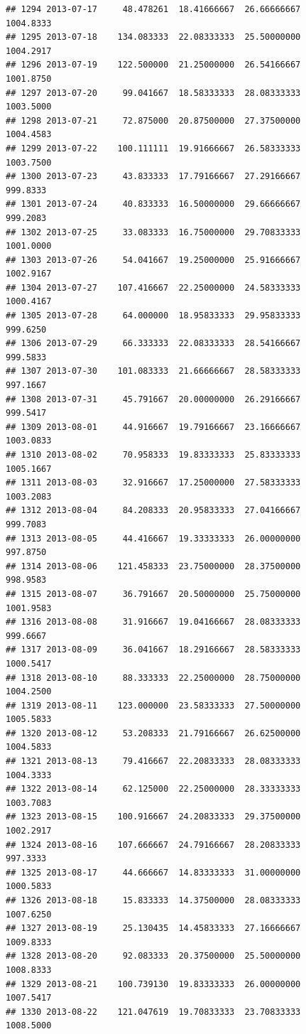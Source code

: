 \documentclass[
]{article}
\begin{document}
\begin{verbatim}
## 1294 2013-07-17     48.478261  18.41666667  26.66666667    1004.8333
## 1295 2013-07-18    134.083333  22.08333333  25.50000000    1004.2917
## 1296 2013-07-19    122.500000  21.25000000  26.54166667    1001.8750
## 1297 2013-07-20     99.041667  18.58333333  28.08333333    1003.5000
## 1298 2013-07-21     72.875000  20.87500000  27.37500000    1004.4583
## 1299 2013-07-22    100.111111  19.91666667  26.58333333    1003.7500
## 1300 2013-07-23     43.833333  17.79166667  27.29166667     999.8333
## 1301 2013-07-24     40.833333  16.50000000  29.66666667     999.2083
## 1302 2013-07-25     33.083333  16.75000000  29.70833333    1001.0000
## 1303 2013-07-26     54.041667  19.25000000  25.91666667    1002.9167
## 1304 2013-07-27    107.416667  22.25000000  24.58333333    1000.4167
## 1305 2013-07-28     64.000000  18.95833333  29.95833333     999.6250
## 1306 2013-07-29     66.333333  22.08333333  28.54166667     999.5833
## 1307 2013-07-30    101.083333  21.66666667  28.58333333     997.1667
## 1308 2013-07-31     45.791667  20.00000000  26.29166667     999.5417
## 1309 2013-08-01     44.916667  19.79166667  23.16666667    1003.0833
## 1310 2013-08-02     70.958333  19.83333333  25.83333333    1005.1667
## 1311 2013-08-03     32.916667  17.25000000  27.58333333    1003.2083
## 1312 2013-08-04     84.208333  20.95833333  27.04166667     999.7083
## 1313 2013-08-05     44.416667  19.33333333  26.00000000     997.8750
## 1314 2013-08-06    121.458333  23.75000000  28.37500000     998.9583
## 1315 2013-08-07     36.791667  20.50000000  25.75000000    1001.9583
## 1316 2013-08-08     31.916667  19.04166667  28.08333333     999.6667
## 1317 2013-08-09     36.041667  18.29166667  28.58333333    1000.5417
## 1318 2013-08-10     88.333333  22.25000000  28.75000000    1004.2500
## 1319 2013-08-11    123.000000  23.58333333  27.50000000    1005.5833
## 1320 2013-08-12     53.208333  21.79166667  26.62500000    1004.5833
## 1321 2013-08-13     79.416667  22.20833333  28.08333333    1004.3333
## 1322 2013-08-14     62.125000  22.25000000  28.33333333    1003.7083
## 1323 2013-08-15    100.916667  24.20833333  29.37500000    1002.2917
## 1324 2013-08-16    107.666667  24.79166667  28.20833333     997.3333
## 1325 2013-08-17     44.666667  14.83333333  31.00000000    1000.5833
## 1326 2013-08-18     15.833333  14.37500000  28.08333333    1007.6250
## 1327 2013-08-19     25.130435  14.45833333  27.16666667    1009.8333
## 1328 2013-08-20     92.083333  20.37500000  25.50000000    1008.8333
## 1329 2013-08-21    100.739130  19.83333333  26.00000000    1007.5417
## 1330 2013-08-22    121.047619  19.70833333  23.70833333    1008.5000

\end{verbatim}
\end{document}
